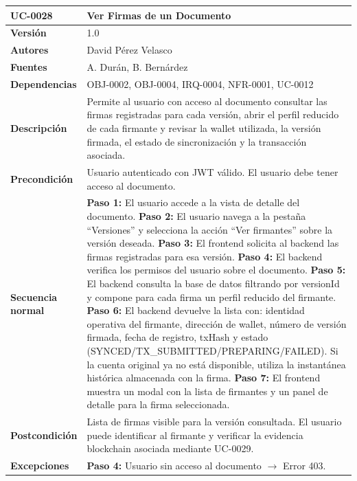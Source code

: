 \documentclass[11pt, a4paper]{article}
\begin{document}
\begin{longtable}{|p{4cm}|p{10cm}|}
\hline
\textbf{UC-0028} & Ver Firmas de un Documento \\
\hline
\textbf{Versión} & 1.0 \\
\hline
\textbf{Autores} & David Pérez Velasco \\
\hline
\textbf{Fuentes} & A. Durán, B. Bernárdez \\
\hline
\textbf{Dependencias} & OBJ-0002, OBJ-0004, IRQ-0004, NFR-0001, UC-0012 \\
\hline
\textbf{Descripción} & Permite al usuario con acceso al documento consultar las firmas registradas para cada versión, abrir el perfil reducido de cada firmante y revisar la wallet utilizada, la versión firmada, el estado de sincronización y la transacción asociada. \\
\hline
\textbf{Precondición} & Usuario autenticado con JWT válido. El usuario debe tener acceso al documento. \\
\hline
\textbf{Secuencia normal} &
\textbf{Paso 1:} El usuario accede a la vista de detalle del documento.\newline
\textbf{Paso 2:} El usuario navega a la pestaña ``Versiones'' y selecciona la acción ``Ver firmantes'' sobre la versión deseada.\newline
\textbf{Paso 3:} El frontend solicita al backend las firmas registradas para esa versión.\newline
\textbf{Paso 4:} El backend verifica los permisos del usuario sobre el documento.\newline
\textbf{Paso 5:} El backend consulta la base de datos filtrando por versionId y compone para cada firma un perfil reducido del firmante.\newline
\textbf{Paso 6:} El backend devuelve la lista con: identidad operativa del firmante, dirección de wallet, número de versión firmada, fecha de registro, txHash y estado (SYNCED/TX\_SUBMITTED/PREPARING/FAILED). Si la cuenta original ya no está disponible, utiliza la instantánea histórica almacenada con la firma.\newline
\textbf{Paso 7:} El frontend muestra un modal con la lista de firmantes y un panel de detalle para la firma seleccionada.\\
\hline
\textbf{Postcondición} & Lista de firmas visible para la versión consultada. El usuario puede identificar al firmante y verificar la evidencia blockchain asociada mediante UC-0029. \\
\hline
\textbf{Excepciones} &
\textbf{Paso 4:} Usuario sin acceso al documento $\rightarrow$ Error 403.\newline

\end{longtable}
\end{document}
